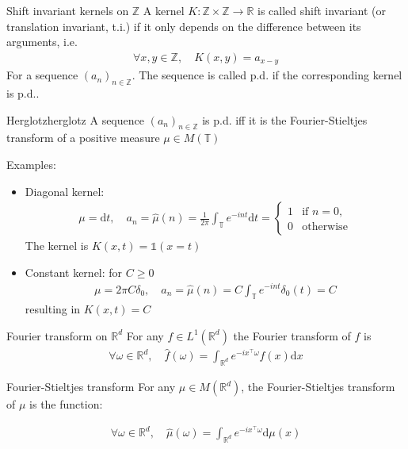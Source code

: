\documentclass[10pt]{article}
\begin{document}
\begin{Definition}{Shift invariant kernels on $\mathbb{Z}$}
  A kernel $K: \mathbb{Z}\times \mathbb{Z} \rightarrow\mathbb{R}$ is called 
  shift invariant (or translation invariant, t.i.) if it only depends on the 
  difference between its arguments, i.e. 
  \begin{align*}
    \forall x, y \in \mathbb{Z}, \quad K(x, y) = a_{x-y}
  \end{align*}
  For a sequence $(a_n)_{n\in\mathbb{Z}}$. The sequence is called p.d. if the 
  corresponding kernel is p.d..
\end{Definition}

\begin{Theorem}{Herglotz}{herglotz}
  A sequence $(a_n)_{n\in\mathbb{Z}}$ is p.d. iff it is the Fourier-Stieltjes 
  transform of a positive measure $\mu \in M(\mathbb{T})$
\end{Theorem}

Examples:
\begin{itemize}
  \item Diagonal kernel: 
  \begin{align*}
    \mu = \text{d}t, \quad a_n = \hat{\mu}(n)=  \frac{1}{2\pi}\int_\mathbb{T}
    e^{-int}\text{d}t = \begin{cases}
      1 & \text{if } n=0,\\
      0 & \text{otherwise}
    \end{cases}
  \end{align*}
  The kernel is $K(x, t) = \mathds{1}(x=t)$
  \item Constant kernel: for $C\geq 0$
  \begin{align*}
    \mu = 2\pi C\delta_0, \quad a_n = \hat{\mu}(n)=  C\int_\mathbb{T}e^{-int}
    \delta_0(t)= C
  \end{align*}
  resulting in $K(x, t) = C$
\end{itemize}

\begin{Definition}{Fourier transform on $\mathbb{R}^d$}{}
  For any $f\in L^1(\mathbb{R}^d)$ the Fourier transform of $f$ is 
  \begin{align*}
    \forall \omega \in \mathbb{R}^d, \quad \hat{f}(\omega) = 
    \int_{\mathbb{R}^d} e^{-i x^\top \omega} f(x)\text{d}x
  \end{align*}
\end{Definition}

\begin{Definition}{Fourier-Stieltjes transform}{}
  For any $\mu \in M(\mathbb{R}^d)$, the Fourier-Stieltjes transform of $\mu$ 
  is the function:

  \begin{align*}
    \forall \omega \in \mathbb{R}^d, \quad\hat{\mu}(\omega) =
    \int_{\mathbb{R}^d}e^{-i x^\top \omega}\text{d}\mu(x)
  \end{align*}
\end{Definition}
\end{document}
